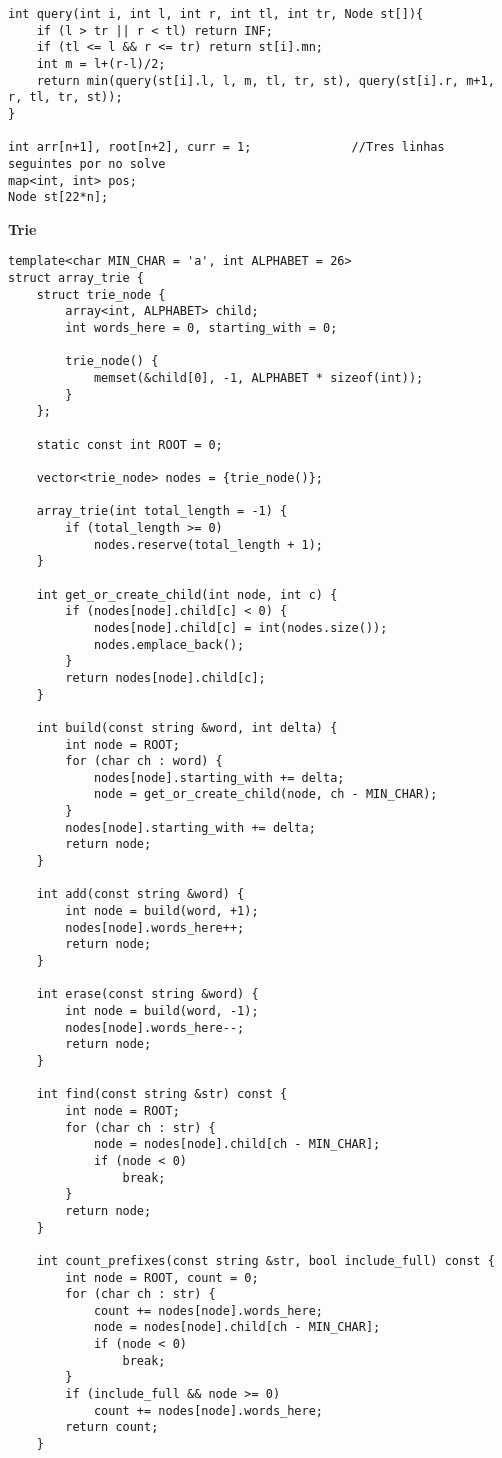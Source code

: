 \documentclass{article}
\begin{document}
\begin{multicols}{2}
\begin{lstlisting}
int query(int i, int l, int r, int tl, int tr, Node st[]){
	if (l > tr || r < tl) return INF;
	if (tl <= l && r <= tr) return st[i].mn;
	int m = l+(r-l)/2;
	return min(query(st[i].l, l, m, tl, tr, st), query(st[i].r, m+1, r, tl, tr, st));
}

int arr[n+1], root[n+2], curr = 1;				//Tres linhas seguintes por no solve
map<int, int> pos;
Node st[22*n];

\end{lstlisting}

\large
\huge\textbf{Trie}
\large
\begin{lstlisting}
template<char MIN_CHAR = 'a', int ALPHABET = 26>
struct array_trie {
	struct trie_node {
		array<int, ALPHABET> child;
		int words_here = 0, starting_with = 0;

		trie_node() {
			memset(&child[0], -1, ALPHABET * sizeof(int));
		}
	};

	static const int ROOT = 0;

	vector<trie_node> nodes = {trie_node()};

	array_trie(int total_length = -1) {
		if (total_length >= 0)
			nodes.reserve(total_length + 1);
	}

	int get_or_create_child(int node, int c) {
		if (nodes[node].child[c] < 0) {
			nodes[node].child[c] = int(nodes.size());
			nodes.emplace_back();
		}
		return nodes[node].child[c];
	}

	int build(const string &word, int delta) {
		int node = ROOT;
		for (char ch : word) {
			nodes[node].starting_with += delta;
			node = get_or_create_child(node, ch - MIN_CHAR);
		}
		nodes[node].starting_with += delta;
		return node;
	}

	int add(const string &word) {
		int node = build(word, +1);
		nodes[node].words_here++;
		return node;
	}

	int erase(const string &word) {
		int node = build(word, -1);
		nodes[node].words_here--;
		return node;
	}

	int find(const string &str) const {
		int node = ROOT;
		for (char ch : str) {
			node = nodes[node].child[ch - MIN_CHAR];
			if (node < 0)
				break;
		}
		return node;
	}

	int count_prefixes(const string &str, bool include_full) const {
		int node = ROOT, count = 0;
		for (char ch : str) {
			count += nodes[node].words_here;
			node = nodes[node].child[ch - MIN_CHAR];
			if (node < 0)
				break;
		}
		if (include_full && node >= 0)
			count += nodes[node].words_here;
		return count;
	}


\end{lstlisting}
\end{multicols}
\end{document}
